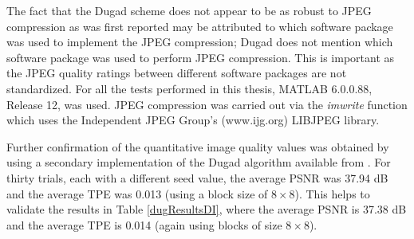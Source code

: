 \documentclass[12pt]{report}
\begin{document}
The fact that the Dugad scheme does not appear to be as robust to JPEG compression
as was first reported may be attributed to which software package was used to implement the
JPEG compression; Dugad does not mention which software package was used to perform
JPEG compression. This is important as the JPEG quality ratings between different software packages are not standardized.
For all the tests performed in this thesis, MATLAB 6.0.0.88, Release 12, was used. JPEG compression
was carried out via the \emph{imwrite} function which uses the Independent JPEG Group's (www.ijg.org) LIBJPEG library.

Further confirmation of the quantitative image quality values was obtained by 
using a secondary implementation of the Dugad algorithm available from 
\cite{meerMasters}. For thirty trials, each with a different seed value,
the average PSNR was 37.94 dB and the average TPE was 0.013 
(using a block size of $8 \times 8$).
This helps to validate the results in Table
\ref{dugResultsDI}, where the average PSNR is 37.38 dB and the
average TPE is 0.014 (again using blocks of size $8 \times 8$).
\end{document}
